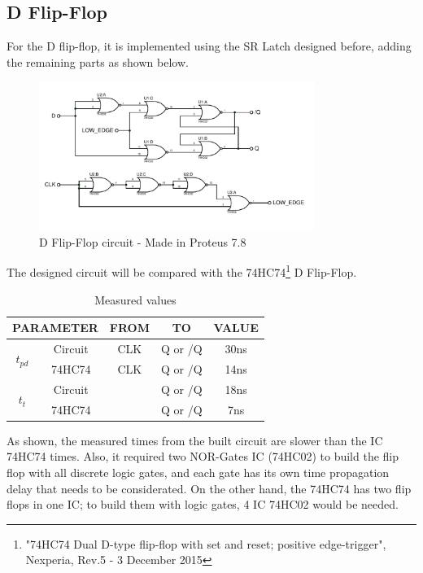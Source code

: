 \subsection*{D Flip-Flop}
For the D flip-flop, it is implemented using 
the SR Latch designed before, adding the 
remaining parts as shown below.

\begin{figure}[H]
    \begin{centering}
    \includegraphics[width=0.8\textwidth]{data/dflipflop}
    \par\end{centering}
    \caption{D Flip-Flop circuit - Made in Proteus 7.8}
\end{figure}

The designed circuit will be compared with the 
74HC74\footnote{"74HC74 Dual D-type flip-flop with set and reset; positive edge-trigger", Nexperia, Rev.5 - 3 December 2015} D Flip-Flop.

\begin{table}[H]
    \begin{center}
        \begin{tabular}{|c|c|c|c|c|}
            \hline 
            \multicolumn{2}{|c|}{PARAMETER} & FROM & TO & VALUE\tabularnewline
            \hline 
            \hline 
            \multirow{2}{*}{$t_{pd}$} & Circuit & CLK & Q or /Q & 30ns\tabularnewline
            \cline{2-5} 
             & 74HC74 & CLK & Q or /Q & 14ns\tabularnewline
            \hline 
            \multirow{2}{*}{$t_t$} & Circuit &  & Q or /Q & 18ns \tabularnewline
            \cline{2-5} 
             & 74HC74 &  & Q or /Q & 7ns\tabularnewline
            \hline 
            \end{tabular}
    \caption{Measured values}
    \end{center}
\end{table}
As shown, the measured times from the built circuit 
are slower than the IC 74HC74 times. Also, it 
required two NOR-Gates IC (74HC02) to build the 
flip flop with all discrete logic gates, and 
each gate has its own time propagation delay that
needs to be considerated. On the other hand, the 
74HC74 has two flip flops in one IC; to build them 
with logic gates, 4 IC 74HC02 would be needed.
